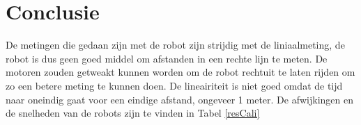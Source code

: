\documentclass{report}
\begin{document}
\chapter{Conclusie}
De metingen die gedaan zijn met de robot zijn strijdig met de liniaalmeting,
de robot is dus geen goed middel om afstanden in een rechte lijn te meten.
De motoren zouden getweakt kunnen worden om de robot rechtuit te laten rijden om zo een betere meting te kunnen doen.
De lineairiteit is niet goed omdat de tijd naar oneindig gaat voor een eindige afstand,
ongeveer 1 meter.
De afwijkingen en de snelheden van de robots zijn te vinden in Tabel \ref{resCali}
\end{document}
